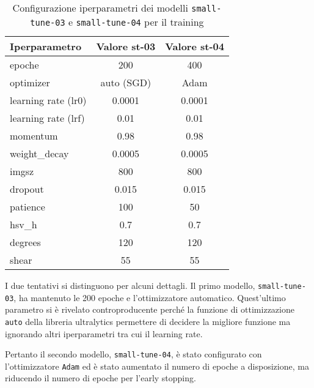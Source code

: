 \begin{table}[!htb]
    \centering
    \begin{tabular}{lcc}
        \hline
        \textbf{Iperparametro} & \textbf{Valore st-03} & \textbf{Valore st-04}\\
        \hline
        epoche & 200 & 400 \\
        optimizer & auto (SGD) & Adam \\
        learning rate (lr0) & 0.0001 & 0.0001\\
        learning rate (lrf) & 0.01 & 0.01 \\
        momentum & 0.98 & 0.98\\
        weight\_decay & 0.0005 & 0.0005\\
        imgsz & 800 & 800 \\
        dropout & 0.015 & 0.015 \\
        patience & 100 & 50\\
        \midrule
        hsv\_h & 0.7 & 0.7 \\
        degrees & 120 & 120 \\
        shear & 55 & 55 \\
        \hline
    \end{tabular}
    \caption{Configurazione iperparametri dei modelli \texttt{small-tune-03} e \texttt{small-tune-04} per il training}
    \label{tab:v4-model-configs}
    \end{table}

I due tentativi si distinguono per alcuni dettagli. Il primo modello, \texttt{small-tune-03},
ha mantenuto le 200 epoche e l'ottimizzatore automatico. Quest'ultimo parametro si è rivelato
 controproducente perché la funzione di ottimizzazione \texttt{auto} della libreria ultralytics
permettere di decidere la migliore funzione ma ignorando altri iperparametri tra cui il learning rate.

Pertanto il secondo modello, \texttt{small-tune-04}, è stato configurato con l'ottimizzatore \texttt{Adam} 
ed è stato aumentato il numero di epoche a disposizione, ma riducendo il numero di epoche per l'early stopping.


